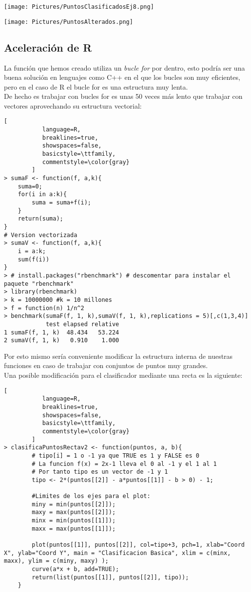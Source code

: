 \documentclass[11pt,fleqn]{book} %
\begin{document}
\texttt{[image: Pictures/PuntosClasificadosEj8.png]}


\texttt{[image: Pictures/PuntosAlterados.png]}

\pagebreak

\subsection{Aceleración de R}
La función que hemos creado utiliza un \textit{bucle for} por dentro, esto podría ser una buena solución en lenguajes como C++ en el que los bucles son muy eficientes, pero en el caso de R el bucle for es una estructura muy lenta.\\
De hecho es trabajar con bucles for es unas 50 veces más lento que trabajar con vectores aprovechando su estructura vectorial:

\begin{lstlisting}[
           language=R,
           breaklines=true,
           showspaces=false,
           basicstyle=\ttfamily,
           commentstyle=\color{gray}
        ]
> sumaF <- function(f, a,k){ 
    suma=0;
    for(i in a:k){
		suma = suma+f(i);
	}
	return(suma);
}
# Version vectorizada
> sumaV <- function(f, a,k){ 
	i = a:k;
    sum(f(i))
}
> # install.packages("rbenchmark") # descomentar para instalar el paquete "rbenchmark"
> library(rbenchmark)
> k = 10000000 #k = 10 millones
> f = function(n) 1/n^2
> benchmark(sumaF(f, 1, k),sumaV(f, 1, k),replications = 5)[,c(1,3,4)]
            test elapsed relative
1 sumaF(f, 1, k)  48.434   53.224
2 sumaV(f, 1, k)   0.910    1.000

\end{lstlisting}

Por esto mismo sería conveniente modificar la estructura interna de nuestras funciones en caso de trabajar con conjuntos de puntos muy grandes.\\
Una posible modificación para el clasificador mediante una recta es la siguiente:

\begin{lstlisting}[
           language=R,
           breaklines=true,
           showspaces=false,
           basicstyle=\ttfamily,
           commentstyle=\color{gray}
        ]
> clasificaPuntosRectav2 <- function(puntos, a, b){
        # tipo[i] = 1 o -1 ya que TRUE es 1 y FALSE es 0
        # La funcion f(x) = 2x-1 lleva el 0 al -1 y el 1 al 1
        # Por tanto tipo es un vector de -1 y 1 
        tipo <- 2*(puntos[[2]] - a*puntos[[1]] - b > 0) - 1;
        
        #Limites de los ejes para el plot:
        miny = min(puntos[[2]]);
        maxy = max(puntos[[2]]);
        minx = min(puntos[[1]]);
        maxx = max(puntos[[1]]);
        
        plot(puntos[[1]], puntos[[2]], col=tipo+3, pch=1, xlab="Coord X", ylab="Coord Y", main = "Clasificacion Basica", xlim = c(minx, maxx), ylim = c(miny, maxy) );
        curve(a*x + b, add=TRUE);
        return(list(puntos[[1]], puntos[[2]], tipo));
    }
\end{lstlisting}
\end{document}
